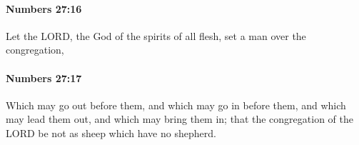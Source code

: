 		\paragraph{Numbers 27:16} %
			\label{NUMBERS-27-16}

			Let the LORD, the God of the spirits of all flesh, set a man over the congregation,


		\paragraph{Numbers 27:17} %
			\label{NUMBERS-27-17}

			Which may go out before them, and which may go in before them, and which may lead them out, and which may bring them in; that the congregation of the LORD be not as sheep which have no shepherd.


